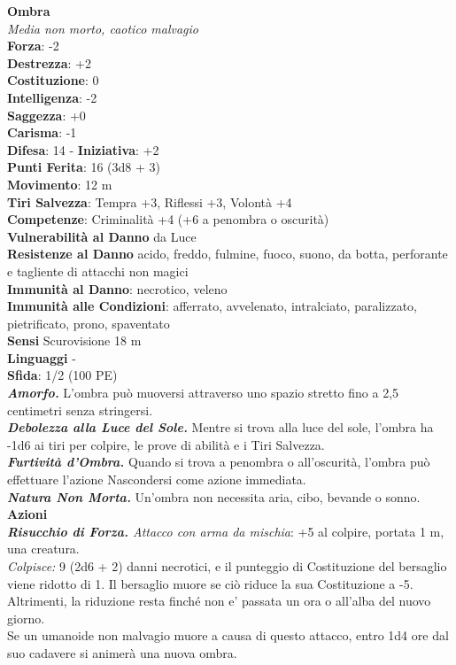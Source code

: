 \begin{multicols}{2}
\medskip\textbf{Ombra}\\
\emph{Media non morto, caotico malvagio}\\
\textbf{Forza}: -2\\
\textbf{Destrezza}: +2\\
\textbf{Costituzione}: 0\\
\textbf{Intelligenza}: -2\\
\textbf{Saggezza}: +0\\
\textbf{Carisma}: -1\\
\textbf{Difesa}: 14 - \textbf{Iniziativa}: +2\\
\textbf{Punti Ferita}: 16 (3d8 + 3)\\
\textbf{Movimento}: 12 m\\
\textbf{Tiri Salvezza}: Tempra +3, Riflessi +3, Volontà +4\\
\textbf{Competenze}: Criminalità +4 (+6 a penombra o oscurità)\\
\textbf{Vulnerabilità al Danno} da Luce\\
\textbf{Resistenze al Danno} acido, freddo, fulmine, fuoco, suono, da botta, perforante e tagliente di attacchi non magici\\
\textbf{Immunità al Danno}: necrotico, veleno\\
\textbf{Immunità alle Condizioni}: afferrato, avvelenato, intralciato, paralizzato, pietrificato, prono, spaventato\\
\textbf{Sensi} Scurovisione 18 m\\
\textbf{Linguaggi} -\\
\textbf{Sfida}: 1/2 (100 PE)\smallskip\\
\emph{\textbf{Amorfo.}} L'ombra può muoversi attraverso uno spazio stretto fino a 2,5 centimetri senza stringersi. \\
\emph{\textbf{Debolezza alla Luce del Sole.}} Mentre si trova alla luce del sole, l'ombra ha -1d6 ai tiri per colpire, le prove di abilità e i Tiri Salvezza.\\
\emph{\textbf{Furtività d'Ombra.}} Quando si trova a penombra o all'oscurità, l'ombra può effettuare l'azione Nascondersi come azione immediata.\\
\emph{\textbf{Natura Non Morta.}} Un'ombra non necessita aria, cibo, bevande o sonno.\\
\smallskip\textbf{Azioni}\\
\emph{\textbf{Risucchio di Forza.} Attacco con arma da mischia}: +5 al colpire, portata 1 m, una creatura.\\
\emph{Colpisce:} 9 (2d6 + 2) danni necrotici, e il punteggio di Costituzione del bersaglio viene ridotto di 1.  Il bersaglio muore se ciò riduce la sua Costituzione a -5. Altrimenti, la riduzione resta finché non e' passata un ora o all'alba del nuovo giorno.\\
Se un umanoide non malvagio muore a causa di questo attacco, entro 1d4 ore dal suo cadavere si animerà una nuova ombra.\\


\end{multicols}
